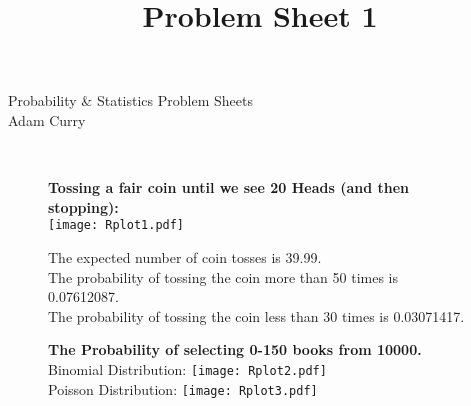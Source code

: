 \documentclass{article}
\title{Problem Sheet 1}
\begin{document}
Probability \& Statistics Problem Sheets\\
Adam Curry
\vspace{3 mm}
\hline
\hspace{25 mm}

\large{}\\

\begin{figure}[h]
\centering
\textbf{Tossing a fair coin until we see 20 Heads (and then stopping):}\\
\texttt{[image: Rplot1.pdf]}

The expected number of coin tosses is 39.99.\\
The probability of tossing the coin more than 50 times is 0.07612087.\\
The probability of tossing the coin less than 30 times is 0.03071417.
\centering
\end{figure}

\begin{figure}[h]
\centering
\textbf{The Probability of selecting 0-150 books from 10000.}\\
Binomial Distribution:
\texttt{[image: Rplot2.pdf]}\\
Poisson Distribution:
\texttt{[image: Rplot3.pdf]}

\centering
\end{figure}
\end{document}

